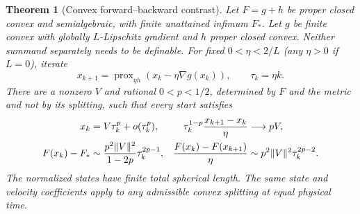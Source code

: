 \documentclass[11pt]{article}
\newtheorem{theorem}{Theorem}[section]
\theoremstyle{remark}\newtheorem{remark}[theorem]{Remark}
\numberwithin{equation}{section}
\begin{document}
\begin{theorem}[Convex forward--backward contrast]\label{thm:fb}
Let $F=g+h$ be proper closed convex and semialgebraic, with finite unattained infimum $F_*$. Let $g$ be finite convex with globally $L$-Lipschitz gradient and $h$ proper closed convex. Neither summand separately needs to be definable. For fixed $0<\eta<2/L$ (any $\eta>0$ if $L=0$), iterate
\[
 x_{k+1}=\operatorname{prox}_{\eta h}(x_k-\eta\nabla g(x_k)),\qquad\tau_k=\eta k.
\]
There are a nonzero $V$ and rational $0<p<1/2$, determined by $F$ and the metric and not by its splitting, such that every start satisfies
\begin{align*}
 x_k&=V\tau_k^p+o(\tau_k^p),&
 \tau_k^{1-p}\frac{x_{k+1}-x_k}{\eta}&\longrightarrow pV,\\
 F(x_k)-F_*&\sim\frac{p^2\lVert V\rVert^2}{1-2p}\tau_k^{2p-1},&
 \frac{F(x_k)-F(x_{k+1})}{\eta}&\sim p^2\lVert V\rVert^2\tau_k^{2p-2}.
\end{align*}
The normalized states have finite total spherical length. The same state and velocity coefficients apply to any admissible convex splitting at equal physical time.
\end{theorem}
\end{document}
